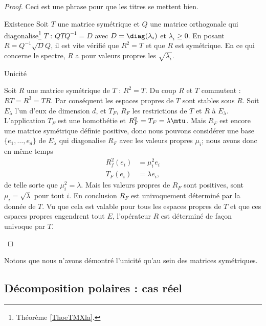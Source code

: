 \begin{proof}
    Ceci est une phrase pour que les titres se mettent bien.
    \begin{subproof}
        \item[Existence]
            Soit \( T\) une matrice symétrique et \( Q\) une matrice orthogonale qui diagonalise\footnote{Théorème \ref{ThoeTMXla}.} \( T\) : \( QTQ^{-1}=D\) avec \( D=\diag(\lambda_i)\) et \( \lambda_i\geq 0\). En posant \( R=Q^{-1}\sqrt{D}Q\), il est vite vérifié que \( R^2=T\) et que \( R\) est symétrique. En ce qui concerne le spectre, \( R\) a pour valeurs propres les \( \sqrt{\lambda_i}\).
        \item[Unicité]

            Soit \( R\) une matrice symétrique de \( T\) : \( R^2=T\). Du coup \( R\) et \( T\) commutent : \( RT=R^3=TR\). Par conséquent les espaces propres de \( T\) sont stables sous \( R\). Soit \( E_{\lambda} \) l'un d'eux de dimension \( d\), et \( T_F\), \( R_F\) les restrictions de \( T\) et \( R\) à \( E_{\lambda}\). L'application \( T_F\) est une homothétie et \( R_F^2=T_F=\lambda\mtu\). Mais \( R_F\) est encore une matrice symétrique définie positive, donc nous pouvons considérer une base \( \{ e_1,\ldots, e_d \}\) de \( E_{\lambda}\) qui diagonalise \( R_F\) avec les valeurs propres \( \mu_i\); nous avons donc en même temps
            \begin{subequations}
                \begin{align}
                    R_f^2(e_i)&=\mu_i^2 e_i\\
                    T_F(e_i)&=\lambda e_i,
                \end{align}
            \end{subequations}
            de telle sorte que \( \mu_i^2=\lambda\). Mais les valeurs propres de \( R_F\) sont positives, sont \( \mu_i=\sqrt{\lambda}\) pour tout \( i\). En conclusion \( R_F\) est univoquement déterminé par la donnée de \( T\). Vu que cela est valable pour tous les espaces propres de \( T\) et que ces espaces propres engendrent tout \( E\), l'opérateur \( R\) est déterminé de façon univoque par \( T\).
    \end{subproof}
\end{proof}
Notons que nous n'avons démontré l'unicité qu'au sein des matrices symétriques.

\subsection{Décomposition polaires : cas réel}

